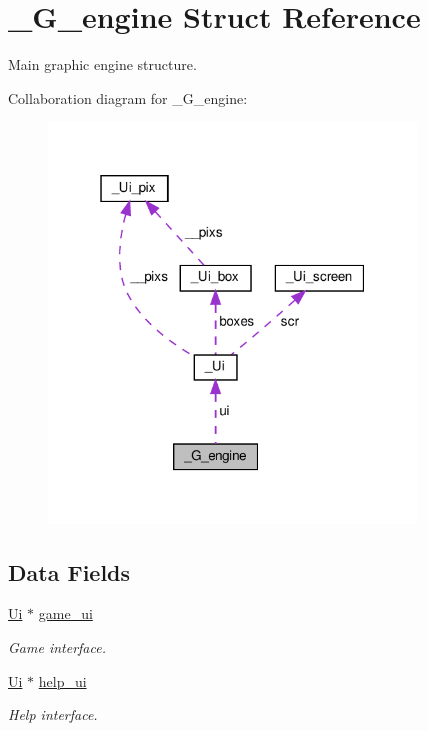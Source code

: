 \hypertarget{struct__G__engine}{}\section{\+\_\+\+G\+\_\+engine Struct Reference}
\label{struct__G__engine}


Main graphic engine structure.  




Collaboration diagram for \+\_\+\+G\+\_\+engine\+:\nopagebreak
\begin{figure}[H]
\begin{center}
\leavevmode
\includegraphics[width=277pt]{struct__G__engine__coll__graph}
\end{center}
\end{figure}
\subsection*{Data Fields}
\begin{DoxyCompactItemize}
\item 
\mbox{\label{struct__G__engine_a56b776923e2d67db123587e106132365}} 
\hyperlink{struct__Ui}{Ui} $\ast$ \hyperlink{struct__G__engine_a56b776923e2d67db123587e106132365}{game\+\_\+ui}
\begin{DoxyCompactList}\small\item\em Game interface. \end{DoxyCompactList}\item 
\mbox{\label{struct__G__engine_a76c426bc9bdd8031c0961abd5530e9c3}} 
\hyperlink{struct__Ui}{Ui} $\ast$ \hyperlink{struct__G__engine_a76c426bc9bdd8031c0961abd5530e9c3}{help\+\_\+ui}
\begin{DoxyCompactList}\small\item\em Help interface. \end{DoxyCompactList}\end{DoxyCompactItemize}


